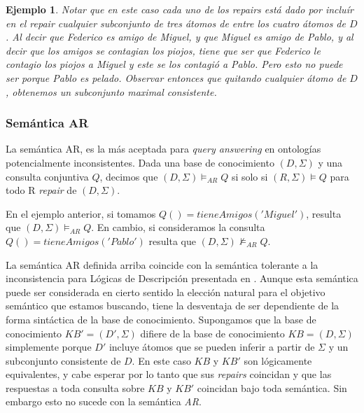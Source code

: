 \documentclass[11pt,a4paper,twoside]{tesis}
\newtheorem{exmp}{Ejemplo}
\begin{document}
\begin{exmp}
Notar que en este caso cada uno de los \textit{repairs} está dado por incluír en el \textit{repair} cualquier subconjunto de tres átomos de entre los cuatro átomos de $D$. Al decir que Federico es amigo de Miguel, y que Miguel es amigo de Pablo, y al decir que los amigos se contagian los piojos, tiene que ser que Federico le contagio los piojos a Miguel y este se los contagió a Pablo. Pero esto no puede ser porque Pablo es pelado. Observar entonces que quitando cualquier átomo de $D$, obtenemos un subconjunto maximal consistente.
    
\end{exmp}

\subsubsection{Semántica AR}
La semántica AR, es la más aceptada para \textit{query answering} en ontologías potencialmente inconsistentes. Dada una base de conocimiento $(D, \Sigma)$ y una consulta conjuntiva $Q$, decimos que $(D, \Sigma) \models_{AR} Q$ si solo si $(R, \Sigma) \models Q$ para todo R \textit{repair} de $(D, \Sigma)$.

En el ejemplo anterior, si tomamos $Q() = tieneAmigos('Miguel')$, resulta que $(D, \Sigma) \models_{AR} Q$. En cambio, si consideramos la consulta $Q() = tieneAmigos('Pablo')$ resulta que $(D, \Sigma)\not\models_{AR} Q$.

La semántica AR definida arriba coincide con la semántica tolerante a la inconsistencia para Lógicas de Descripción presentada en \cite{Lembo}. Aunque esta semántica puede ser considerada en cierto sentido la elección natural para el objetivo semántico que estamos buscando, tiene la desventaja de ser dependiente de la forma sintáctica de la base de conocimiento. Supongamos que la base de conocimiento $KB\prime = (D\prime, \Sigma)$ difiere de la base de conocimiento $KB = (D, \Sigma)$ simplemente porque $D\prime$ incluye átomos que se pueden inferir a partir de $\Sigma$ y un subconjunto consistente de $D$. En este caso $KB$ y $KB\prime$ son lógicamente equivalentes, y cabe esperar por lo tanto que sus \textit{repairs} coincidan y que las respuestas a toda consulta sobre $KB$ y $KB\prime$ coincidan bajo toda semántica. Sin embargo esto no sucede con la semántica \textit{AR}. 
\end{document}

